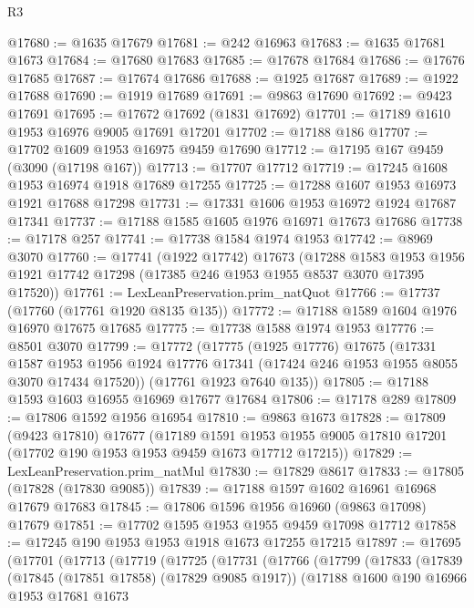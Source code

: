 \begin{lexlean}{R3}
\begin{coremodule}
@17680 := @1635 @17679
@17681 := @242 @16963
@17683 := @1635 @17681 @1673
@17684 := @17680 @17683
@17685 := @17678 @17684
@17686 := @17676 @17685
@17687 := @17674 @17686
@17688 := @1925 @17687
@17689 := @1922 @17688
@17690 := @1919 @17689
@17691 := @9863 @17690
@17692 := @9423 @17691
@17695 := @17672 @17692 (@1831 @17692)
@17701 := @17189 @1610 @1953 @16976 @9005 @17691 @17201
@17702 := @17188 @186
@17707 := @17702 @1609 @1953 @16975 @9459 @17690
@17712 := @17195 @167 @9459 (@3090 (@17198 @167))
@17713 := @17707 @17712
@17719 := @17245 @1608 @1953 @16974 @1918 @17689 @17255
@17725 := @17288 @1607 @1953 @16973 @1921 @17688 @17298
@17731 := @17331 @1606 @1953 @16972 @1924 @17687 @17341
@17737 := @17188 @1585 @1605 @1976 @16971 @17673 @17686
@17738 := @17178 @257
@17741 := @17738 @1584 @1974 @1953
@17742 := @8969 @3070
@17760 := @17741
    (@1922 @17742)
    @17673
    (@17288
      @1583
      @1953
      @1956
      @1921
      @17742
      @17298
      (@17385 @246 @1953 @1955 @8537 @3070 @17395 @17520))
@17761 := LexLeanPreservation.prim_natQuot
@17766 := @17737 (@17760 (@17761 @1920 @8135 @135))
@17772 := @17188 @1589 @1604 @1976 @16970 @17675 @17685
@17775 := @17738 @1588 @1974 @1953
@17776 := @8501 @3070
@17799 := @17772
    (@17775
      (@1925 @17776)
      @17675
      (@17331
        @1587
        @1953
        @1956
        @1924
        @17776
        @17341
        (@17424 @246 @1953 @1955 @8055 @3070 @17434 @17520))
      (@17761 @1923 @7640 @135))
@17805 := @17188 @1593 @1603 @16955 @16969 @17677 @17684
@17806 := @17178 @289
@17809 := @17806 @1592 @1956 @16954
@17810 := @9863 @1673
@17828 := @17809
    (@9423 @17810)
    @17677
    (@17189
      @1591
      @1953
      @1955
      @9005
      @17810
      @17201
      (@17702 @190 @1953 @1953 @9459 @1673 @17712 @17215))
@17829 := LexLeanPreservation.prim_natMul
@17830 := @17829 @8617
@17833 := @17805 (@17828 (@17830 @9085))
@17839 := @17188 @1597 @1602 @16961 @16968 @17679 @17683
@17845 := @17806 @1596 @1956 @16960 (@9863 @17098) @17679
@17851 := @17702 @1595 @1953 @1955 @9459 @17098 @17712
@17858 := @17245 @190 @1953 @1953 @1918 @1673 @17255 @17215
@17897 := @17695
    (@17701
      (@17713
        (@17719
          (@17725
            (@17731
              (@17766
                (@17799
                  (@17833
                    (@17839
                      (@17845 (@17851 @17858) (@17829 @9085 @1917))
                      (@17188
                        @1600
                        @190
                        @16966
                        @1953
                        @17681
                        @1673

\end{coremodule}
\end{lexlean}
